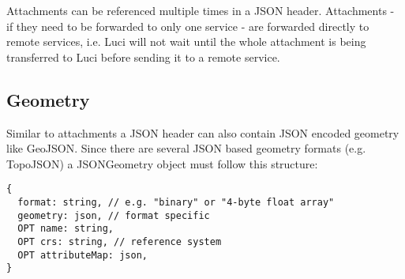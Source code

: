 Attachments can be referenced multiple times in a JSON header. Attachments - if they need to be forwarded to only one service - are forwarded directly to remote services, i.e. Luci will not wait until the whole attachment is being transferred to Luci before sending it to a remote service.

\subsection{Geometry}
Similar to attachments a JSON header can also contain JSON encoded geometry like GeoJSON. Since there are several JSON based geometry formats (e.g. TopoJSON) a JSONGeometry object must follow this structure:

\begin{lstlisting}
{
  format: string, // e.g. "binary" or "4-byte float array"
  geometry: json, // format specific
  OPT name: string,
  OPT crs: string, // reference system
  OPT attributeMap: json,
}
\end{lstlisting}

